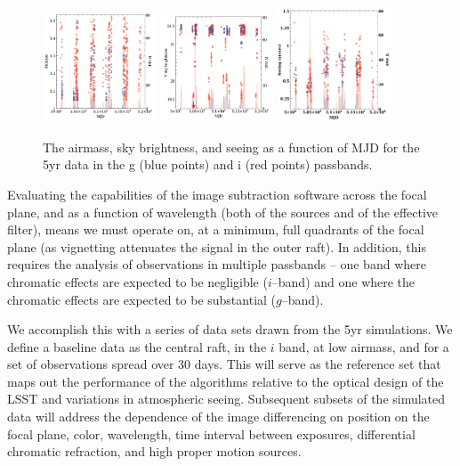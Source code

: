 \documentclass[prd, nofootinbib, floatfix, 11pt,tightenlines,times]{article}
\begin{document}
\begin{figure}
\centerline{
\includegraphics[width=0.3\textwidth]{Figures/airmass_mjd.png}\hfil
\includegraphics[width=0.3\textwidth]{Figures/sky_mjd.png}\hfil
\includegraphics[width=0.3\textwidth]{Figures/seeing.png}
}
\caption{The airmass, sky brightness, and seeing as a function of MJD for the
  5yr data in the g (blue points) and i (red points) passbands.}
\label{airmass}
\end{figure}

Evaluating the capabilities of the image subtraction software across
the focal plane, and as a function of wavelength (both of the sources
and of the effective filter),  means we must operate on, at a minimum,
full quadrants of the focal plane (as vignetting attenuates the signal
in the outer raft).  In addition, this requires the analysis of observations in multiple
passbands -- one band where chromatic effects are expected to be
negligible ($i$--band) and one where the chromatic effects are
expected to be substantial ($g$--band).

We accomplish this with a series of data sets drawn from the 5yr
simulations. We define a baseline data as the central raft, in the $i$
band, at low airmass, and for a set of observations spread
over 30 days.  This will serve as the reference set that maps out the
performance of the algorithms relative to the optical design of the
LSST and variations in atmospheric seeing. Subsequent subsets of the
simulated data will address the dependence of the image differencing
on position on the focal plane, color, wavelength, time interval
between exposures, differential chromatic refraction, and high proper
motion sources. 
\end{document}
